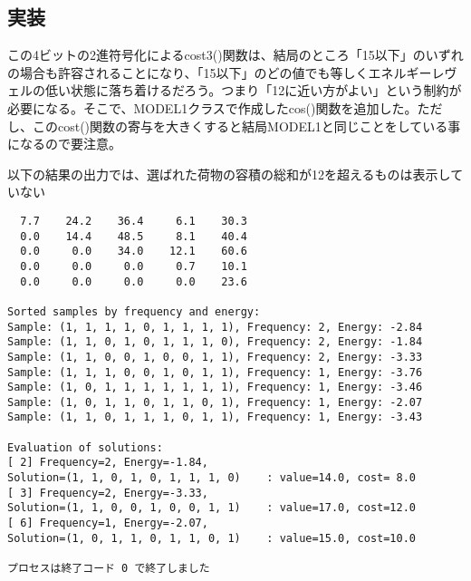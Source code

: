 \documentclass[uplatex,dvipdfmx,a4paper,11pt,oneside,openany]{jsbook}
\begin{document}
\subsection{実装}



この4ビットの2進符号化によるcost3()関数は、結局のところ「15以下」のいずれの場合も許容されることになり、「15以下」のどの値でも等しくエネルギーレヴェルの低い状態に落ち着けるだろう。つまり「12に近い方がよい」という制約が必要になる。そこで、MODEL1クラスで作成したcos()関数を追加した。ただし、このcost()関数の寄与を大きくすると結局MODEL1と同じことをしている事になるので要注意。

以下の結果の出力では、選ばれた荷物の容積の総和が12を超えるものは表示していない

\begin{verbatim}
  7.7    24.2    36.4     6.1    30.3
  0.0    14.4    48.5     8.1    40.4
  0.0     0.0    34.0    12.1    60.6
  0.0     0.0     0.0     0.7    10.1
  0.0     0.0     0.0     0.0    23.6

Sorted samples by frequency and energy:
Sample: (1, 1, 1, 1, 0, 1, 1, 1, 1), Frequency: 2, Energy: -2.84
Sample: (1, 1, 0, 1, 0, 1, 1, 1, 0), Frequency: 2, Energy: -1.84
Sample: (1, 1, 0, 0, 1, 0, 0, 1, 1), Frequency: 2, Energy: -3.33
Sample: (1, 1, 1, 0, 0, 1, 0, 1, 1), Frequency: 1, Energy: -3.76
Sample: (1, 0, 1, 1, 1, 1, 1, 1, 1), Frequency: 1, Energy: -3.46
Sample: (1, 0, 1, 1, 0, 1, 1, 0, 1), Frequency: 1, Energy: -2.07
Sample: (1, 1, 0, 1, 1, 1, 0, 1, 1), Frequency: 1, Energy: -3.43

Evaluation of solutions:
[ 2] Frequency=2, Energy=-1.84,
Solution=(1, 1, 0, 1, 0, 1, 1, 1, 0)	: value=14.0, cost= 8.0
[ 3] Frequency=2, Energy=-3.33,
Solution=(1, 1, 0, 0, 1, 0, 0, 1, 1)	: value=17.0, cost=12.0
[ 6] Frequency=1, Energy=-2.07,
Solution=(1, 0, 1, 1, 0, 1, 1, 0, 1)	: value=15.0, cost=10.0

プロセスは終了コード 0 で終了しました
\end{verbatim}
\end{document}
